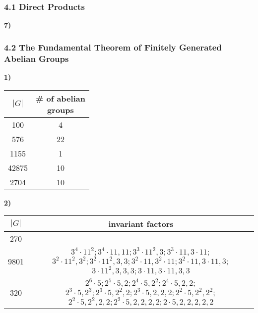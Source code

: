 \documentclass[12pt]{article}
\newcommand{\vertb}[1]{\left\vert#1\right\vert}
\begin{document}
\pagestyle{fancy}

\setlength{\parindent}{0in}
\setlength{\parskip}{0.15in}

\subsubsection*{4.1 Direct Products}

\textbf{7)} -

\subsubsection*{4.2 The Fundamental Theorem of Finitely Generated Abelian Groups}

\textbf{1)}
\begin{center}
	\begin{tabular}{c|c}
		\( \vertb{G} \)
		& \makecell{\# \textbf{of abelian} \\ \textbf{groups}} \\
		\hline
		\hline
		100   & 4  \\
		576   & 22 \\
		1155  & 1  \\
		42875 & 10 \\
		2704  & 10
	\end{tabular}
\end{center}

\textbf{2)}
\begin{center}
	\begin{tabular}{c|c}
		\( \vertb{G} \) & \textbf{invariant factors} \\
		\hline\hline
		270  & \makecell{
			\(
				2 \cdot 3^3 \cdot 5;
				2 \cdot 3^2 \cdot 5, 3;
				2 \cdot 3 \cdot 5, 3, 3
			\)
		} \\
		\hline\hline
		9801 & \makecell{
			\(
				3^4 \cdot 11^2;
				3^4 \cdot 11, 11;
				3^3 \cdot 11^2, 3;
				3^3 \cdot 11, 3 \cdot 11;
			\) \\ \(
				3^2 \cdot 11^2, 3^2;
				3^2 \cdot 11^2, 3, 3;
				3^2 \cdot 11, 3^2 \cdot 11;
				3^2 \cdot 11, 3 \cdot 11, 3;
			\) \\ \(
				3 \cdot 11^2, 3, 3, 3;
				3 \cdot 11, 3 \cdot 11, 3, 3
			\)
		} \\
		\hline\hline
		320 & \makecell{
			\(
				2^6 \cdot 5;
				2^5 \cdot 5, 2;
				2^4 \cdot 5, 2^2;
				2^4 \cdot 5, 2, 2;
			\) \\ \(
				2^3 \cdot 5, 2^3;
				2^3 \cdot 5, 2^2, 2;
				2^3 \cdot 5, 2, 2, 2;
				2^2 \cdot 5, 2^2, 2^2;
			\) \\ \(
				2^2 \cdot 5, 2^2, 2, 2;
				2^2 \cdot 5, 2, 2, 2, 2;
				2 \cdot 5, 2, 2, 2, 2, 2
			\)
		}
	\end{tabular}
\end{center}
\end{document}
